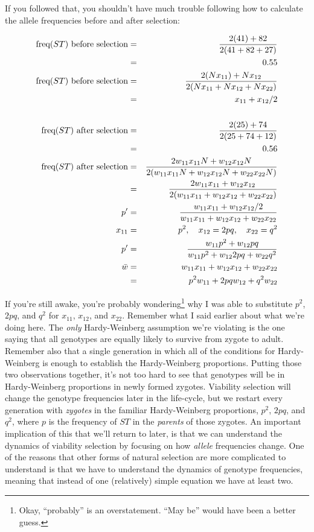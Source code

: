 \documentclass[12pt]{article}
\begin{document}
If you followed that, you shouldn't have much trouble following how to
calculate the allele frequencies before and after selection:

\begin{eqnarray*}
\hbox{freq($ST$) before selection}
 &=& \frac{2(41) + 82}{2(41 + 82 + 27)} \\
 &=& 0.55 \\
\hbox{freq($ST$) before selection}
 &=& \frac{2(Nx_{11}) + Nx_{12}}{2(Nx_{11} + Nx_{12} + Nx_{22})} \\
 &=& x_{11} + x_{12}/2 \\
&& \\
\hbox{freq($ST$) after selection}
 &=& \frac{2(25) + 74}{2(25 + 74 + 12)} \\
 &=& 0.56 \\
\hbox{freq($ST$) after selection}
 &=& \frac{2w_{11}x_{11}N + w_{12}x_{12}N}{2(w_{11}x_{11}N + w_{12}x_{12}N + w_{22}x_{22}N)} \\
 &=& \frac{2w_{11}x_{11} + w_{12}x_{12}}{2(w_{11}x_{11} + w_{12}x_{12} + w_{22}x_{22})} \\
p' &=& \frac{w_{11}x_{11} + w_{12}x_{12}/2}{w_{11}x_{11} +
 w_{12}x_{12} + w_{22}x_{22}} \\
x_{11} &=& p^2, \quad x_{12} = 2pq, \quad x_{22} = q^2 \\
p' &=& \frac{w_{11}p^2 + w_{12}pq}{w_{11}p^2 + w_{12}2pq + w_{22}q^2} \\
\bar w &=& w_{11}x_{11} + w_{12}x_{12} + w_{22}x_{22} \\
       &=& p^2w_{11} + 2pqw_{12} + q^2w_{22}
\end{eqnarray*}

If you're still awake, you're probably wondering\footnote{Okay,
  ``probably'' is an overstatement. ``May be'' would have been a
  better guess.} why I was able to substitute $p^2$, $2pq$, and $q^2$
for $x_{11}$, $x_{12}$, and $x_{22}$. Remember what I said earlier
about what we're doing here. The {\it only\/} Hardy-Weinberg
assumption we're violating is the one saying that all genotypes are
equally likely to survive from zygote to adult. Remember also that a
single generation in which all of the conditions for Hardy-Weinberg is
enough to establish the Hardy-Weinberg proportions. Putting those two
observations together, it's not too hard to see that genotypes will be
in Hardy-Weinberg proportions in newly formed zygotes. Viability
selection will change the genotype frequencies later in the
life-cycle, but we restart every generation with {\it zygotes\/} in
the familiar Hardy-Weinberg proportions, $p^2$, $2pq$, and $q^2$,
where $p$ is the frequency of $ST$ in the {\it parents\/} of those
zygotes. An important implication of this
that we'll return to later, is that we can understand the dynamics of
viability selection by focusing on how {\it allele\/} frequencies
change. One of the reasons that other forms of natural selection are
more complicated to understand is that we have to understand the
dynamics of genotype frequencies, meaning that instead of one
(relatively) simple equation we have at least two.
\end{document}
